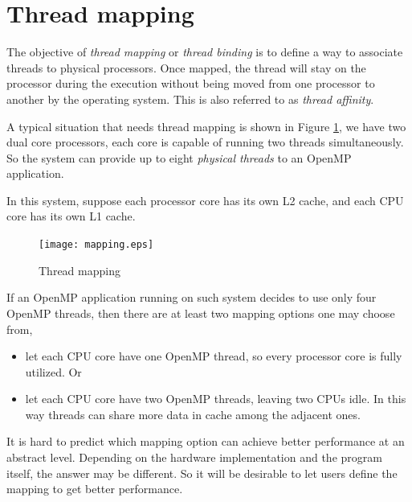 
\section{Thread mapping}

The objective of \emph{thread mapping} or \emph{thread binding} is to define a
way to associate threads to physical processors. Once
mapped, the thread will stay on the processor during the execution without
being moved from one processor to another by the operating system. This is also
referred to as \emph{thread affinity}.


A typical situation that needs thread mapping is shown in Figure
\ref{fig:mapping}, we have two dual core processors, each core is capable of
running two threads simultaneously. So the system can provide up to eight
\emph{physical threads} to an OpenMP application. 

In this system, suppose each processor core has its own L2 cache, and each CPU
core has its own L1 cache.

\begin{figure}[h!]
  \begin{center}
    \texttt{[image: mapping.eps]}
    \caption{\footnotesize Thread mapping}
    \label{fig:mapping}
  \end{center}
\end{figure}

If an OpenMP application running on such system decides to use only four OpenMP
threads, then there are at least two mapping options one may choose from,

\begin{itemize} 

\item  let each CPU core have one OpenMP thread, so every processor core is
fully utilized. Or

\item let each CPU core have two OpenMP threads, leaving two CPUs idle. In this
way threads can share more data in cache among the adjacent ones.

\end{itemize}

It is hard to predict which mapping option can achieve better performance at an
abstract level. Depending on the hardware implementation and the program
itself, the answer may be different. So it will be desirable to let users
define the mapping to get better performance.

